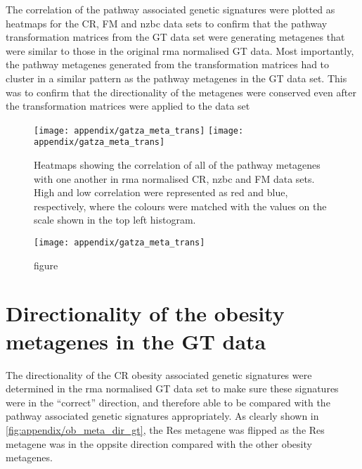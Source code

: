 	The correlation of the pathway associated genetic signatures were plotted as heatmaps for the CR, FM and \gls{nzbc} data sets to confirm that the pathway transformation matrices from the GT data set were generating metagenes that were similar to those in the original \gls{rma} normalised GT data.
	Most importantly, the pathway metagenes generated from the transformation matrices had to cluster in a similar pattern as the pathway metagenes in the GT data set.
	This was to confirm that the directionality of the metagenes were conserved even after the transformation matrices were applied to the data set

	\begin{figure}[htp!]
		\centering
		\texttt{[image: appendix/gatza\_meta\_trans]}
		\texttt{[image: appendix/gatza\_meta\_trans]}
		\caption[Heatmaps of the Pearson correlation of all the pathway metagenes in the \gls{rma}-normalised CR, \gls{nzbc} and FM data]{Heatmaps showing the correlation of all of the pathway metagenes with one another in \gls{rma} normalised CR, \gls{nzbc} and FM data sets.
		High and low correlation were represented as red and blue, respectively, where the colours were matched with the values on the scale shown in the top left histogram.}
		\label{fig:appendix/gt_pathmeta_other_data}
	\end{figure}

	\begin{figure}[htpb]
		\ContinuedFloat
		\captionsetup{list=off,format=cont}
		\centering
		\texttt{[image: appendix/gatza\_meta\_trans]}
		\caption[]{figure}
	\end{figure}

	\section{Directionality of the obesity metagenes in the GT data}
	\label{sec:directionality_of_the_obesity_metagenes_in_the_gt_data}

	The directionality of the CR obesity associated genetic signatures were determined in the \gls{rma} normalised GT data set to make sure these signatures were in the ``correct'' direction, and therefore able to be compared with the pathway associated genetic signatures appropriately.
	As clearly shown in \cref{fig:appendix/ob_meta_dir_gt}, the Res metagene was flipped as the Res metagene was in the oppsite direction compared with the other obesity metagenes.

